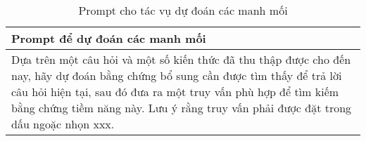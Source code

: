 \begin{table}[ht]
    \centering
    \caption{Prompt cho tác vụ dự đoán các manh mối}
    \label{tab:requery_prompt}
    \small{\begin{tabular}{p{}}
            \toprule
            \textbf{Prompt để dự đoán các manh mối}                                                                                                                                                                                                                                                     \\
            \midrule
            Dựa trên một câu hỏi và một số kiến thức đã thu thập được cho đến nay, hãy dự đoán bằng chứng bổ sung cần được tìm thấy để trả lời câu hỏi hiện tại, sau đó đưa ra một truy vấn phù hợp để tìm kiếm bằng chứng tiềm năng này. Lưu ý rằng truy vấn phải được đặt trong dấu ngoặc nhọn {xxx}. \\
            \bottomrule
        \end{tabular}}
\end{table}